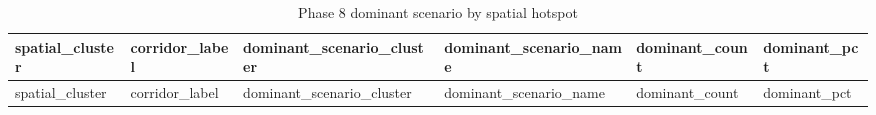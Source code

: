\documentclass[
]{article}
\begin{document}
\begin{longtable}[]{@{}
  >{\raggedleft\arraybackslash}p{}
  >{\raggedright\arraybackslash}p{}
  >{\raggedleft\arraybackslash}p{}
  >{\raggedright\arraybackslash}p{}
  >{\raggedleft\arraybackslash}p{}
  >{\raggedleft\arraybackslash}p{}@{}}
\caption{Phase 8 dominant scenario by spatial hotspot}\tabularnewline
\toprule\noalign{}
\begin{minipage}[b]{\linewidth}\raggedleft
spatial\_cluster
\end{minipage} & \begin{minipage}[b]{\linewidth}\raggedright
corridor\_label
\end{minipage} & \begin{minipage}[b]{\linewidth}\raggedleft
dominant\_scenario\_cluster
\end{minipage} & \begin{minipage}[b]{\linewidth}\raggedright
dominant\_scenario\_name
\end{minipage} & \begin{minipage}[b]{\linewidth}\raggedleft
dominant\_count
\end{minipage} & \begin{minipage}[b]{\linewidth}\raggedleft
dominant\_pct
\end{minipage} \\
\midrule\noalign{}
\endfirsthead
\toprule\noalign{}
\begin{minipage}[b]{\linewidth}\raggedleft
spatial\_cluster
\end{minipage} & \begin{minipage}[b]{\linewidth}\raggedright
corridor\_label
\end{minipage} & \begin{minipage}[b]{\linewidth}\raggedleft
dominant\_scenario\_cluster
\end{minipage} & \begin{minipage}[b]{\linewidth}\raggedright
dominant\_scenario\_name
\end{minipage} & \begin{minipage}[b]{\linewidth}\raggedleft
dominant\_count
\end{minipage} & \begin{minipage}[b]{\linewidth}\raggedleft
dominant\_pct
\end{minipage} \\

\end{longtable}
\end{document}
